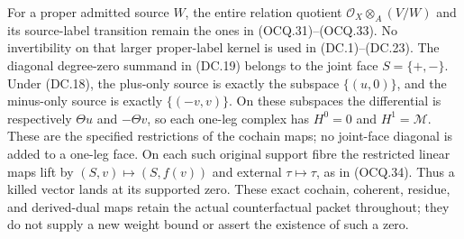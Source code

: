 For a proper admitted source $W$, the entire relation quotient
$\mathcal O_X\otimes_A(V/W)$ and its source-label transition
remain the ones in (OCQ.31)--(OCQ.33).  No invertibility on that
larger proper-label kernel is used in (DC.1)--(DC.23).
The diagonal degree-zero summand in (DC.19) belongs to the joint
face $S=\{+,-\}$.  Under (DC.18), the plus-only source is exactly
the subspace $\{(u,0)\}$, and the minus-only source is exactly
$\{(-v,v)\}$.  On these subspaces the differential is respectively
$\Theta u$ and $-\Theta v$, so each one-leg complex has
$H^0=0$ and $H^1=\mathcal M$.  These are the specified restrictions
of the cochain maps; no joint-face diagonal is added to a one-leg
face.  On each such original support fibre the restricted linear
maps lift by $(S,v)\mapsto(S,f(v))$ and external
$\tau\mapsto\tau$, as in (OCQ.34).  Thus a killed vector lands
at its supported zero.
These exact cochain, coherent, residue, and derived-dual maps
retain the actual counterfactual packet throughout; they do not
supply a new weight bound or assert the existence of such a zero.
